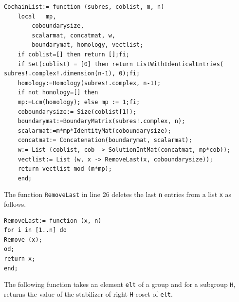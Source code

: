 \documentclass[11pt]{book}
\theoremstyle{Rem}
\theoremstyle{definition}
\numberwithin{equation}{section}
\begin{document}
\begin{lstlisting}
CochainList:= function (subres, coblist, m, n) 
	local   mp,
		coboundarysize,
		scalarmat, concatmat, w,
		boundarymat, homology, vectlist;
	if coblist=[] then return [];fi;
	if Set(coblist) = [0] then return ListWithIdenticalEntries( subres!.complex!.dimension(n-1), 0);fi;
	homology:=Homology(subres!.complex, n-1);
	if not homology=[] then
	mp:=Lcm(homology); else mp := 1;fi;
	coboundarysize:= Size(coblist[1]);
	boundarymat:=BoundaryMatrix(subres!.complex, n);
	scalarmat:=m*mp*IdentityMat(coboundarysize);
	concatmat:= Concatenation(boundarymat, scalarmat); 
	w:= List (coblist, cob -> SolutionIntMat(concatmat, mp*cob));
	vectlist:= List (w, x -> RemoveLast(x, coboundarysize));
	return vectlist mod (m*mp);
	end;
\end{lstlisting}
The function \lstinline{RemoveLast} in line 26 deletes the last \lstinline{n} entries from a list \lstinline{x} as follows.
\begin{lstlisting}
RemoveLast:= function (x, n)
for i in [1..n] do
Remove (x);
od;
return x;
end;
\end{lstlisting}

The following function takes an element \lstinline{elt} of a group and for a subgroup \lstinline{H}, returns the value of the stabilizer of  right \lstinline{H}-coset of \lstinline{elt}.
\end{document}
